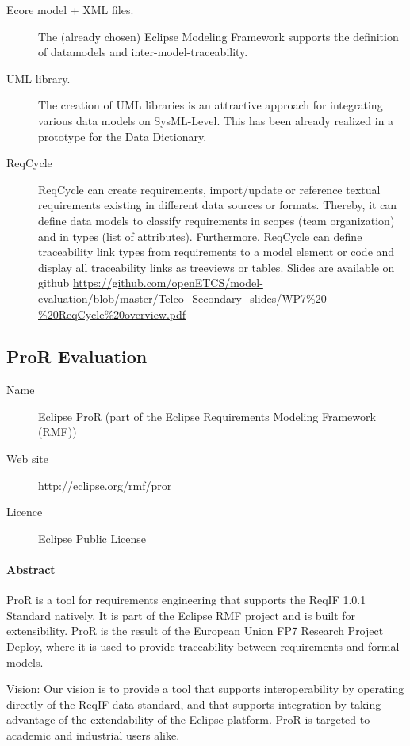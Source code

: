 \begin{description}

\item [Ecore model + XML  files.]  The (already chosen) Eclipse Modeling Framework supports the definition of datamodels and inter-model-traceability.
\item [UML library.]  The creation of UML libraries is an attractive approach for integrating various data models on SysML-Level.  This has been already realized in a prototype for the Data Dictionary.
\item [ReqCycle]
ReqCycle can create requirements, import/update or reference textual requirements existing in different data sources or formats. Thereby, it can define data models to classify requirements in scopes (team organization) and in types (list of attributes). Furthermore, ReqCycle can define traceability link types from requirements to a model element or code and display all traceability links as treeviews or tables. Slides are available on github \url{https://github.com/openETCS/model-evaluation/blob/master/Telco_Secondary_slides/WP7%20-%20ReqCycle%20overview.pdf}
\end{description}

\subsection{ProR Evaluation}
\label{sec:ProR}

\begin{description}
\item[Name] Eclipse ProR (part of the Eclipse Requirements Modeling Framework (RMF))
\item[Web site] http://eclipse.org/rmf/pror
\item[Licence] Eclipse Public License
\end{description} 

\paragraph{Abstract}

ProR is a tool for requirements engineering that supports the ReqIF 1.0.1 Standard natively. It is part of the Eclipse RMF project and is built for extensibility. ProR is the result of the European Union FP7 Research Project Deploy, where it is used to provide traceability between requirements and formal models.

Vision: Our vision is to provide a tool that supports interoperability by operating directly of the ReqIF data standard, and that supports integration by taking advantage of the extendability of the Eclipse platform. ProR is targeted to academic and industrial users alike. 

